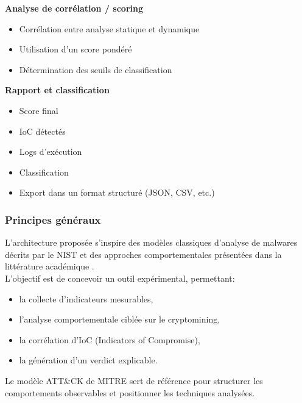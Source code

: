 \textbf{Analyse de corrélation / scoring}
\begin{itemize}
    \item Corrélation entre analyse statique et dynamique
    \item Utilisation d'un score pondéré
    \item Détermination des seuils de classification
\end{itemize}

\textbf{Rapport et classification}
\begin{itemize}
    \item Score final
    \item IoC détectés
    \item Logs d'exécution
    \item Classification
    \item Export dans un format structuré (JSON, CSV, etc.)
\end{itemize}

\subsubsection{Principes généraux}
L'architecture proposée s'inspire des modèles classiques d'analyse de malwares décrits par le NIST \cite{souppaya2013nist80083} \cite{nelson2025nist80061} et des approches comportementales présentées dans la littérature académique \cite{dahlmanns2023secrets} \cite{bufalino2025orca}. \\
\newline
L'objectif est de concevoir un outil expérimental, permettant:
\begin{itemize}
    \item la collecte d'indicateurs mesurables,
    \item l'analyse comportementale ciblée sur le cryptomining,
    \item la corrélation d'IoC (Indicators of Compromise),
    \item la génération d'un verdict explicable.
\end{itemize}

Le modèle ATT\&CK de MITRE \cite{mitreT1204003} sert de référence pour structurer les comportements observables et positionner les techniques analysées.  \\


